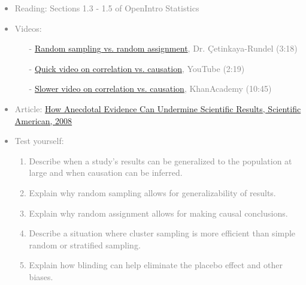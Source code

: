 \documentclass[11pt]{article}
\newcommand{\gray}[1]{\textcolor{gray}{#1}}
\begin{document}
\gray{
{\it
\vspace{-0.75cm}
\begin{itemize}
\renewcommand{\labelitemi}{{\textcolor{dark}{$\ast$}}}
\item Reading: Sections 1.3 - 1.5 of OpenIntro Statistics
\item Videos:
\begin{itemize}
\item[-] \href{http://youtu.be/S6y4QV7Kyl4}{Random sampling vs. random assignment}, Dr. \c{C}etinkaya-Rundel (3:18)
\item[-] \href{http://www.youtube.com/watch?v=5zyruPbgxyM}{Quick video on correlation vs. causation}, YouTube (2:19)
\item[-] \href{http://www.khanacademy.org/math/statistics/v/correlation-and-causality}{Slower video on correlation vs. causation}, KhanAcademy (10:45)
\end{itemize}
\item Article: \href{http://www.scientificamerican.com/article.cfm?id=how-anecdotal-evidence-can-undermine-scientific-results}{How Anecdotal Evidence Can Undermine Scientific Results, Scientific American, 2008}
\item Test yourself: 
\begin{enumerate}
\item Describe when a study's results can be generalized to the population at large and when causation can be inferred.
\item Explain why random sampling allows for generalizability of results.
\item Explain why random assignment allows for making causal conclusions.
\item Describe a situation where cluster sampling is more efficient than simple random or stratified sampling. 
\item Explain how blinding can help eliminate the placebo effect and other biases. \\
\end{enumerate}
\end{itemize}
}}

%

\vspace{0.5cm}

%
\end{document}
